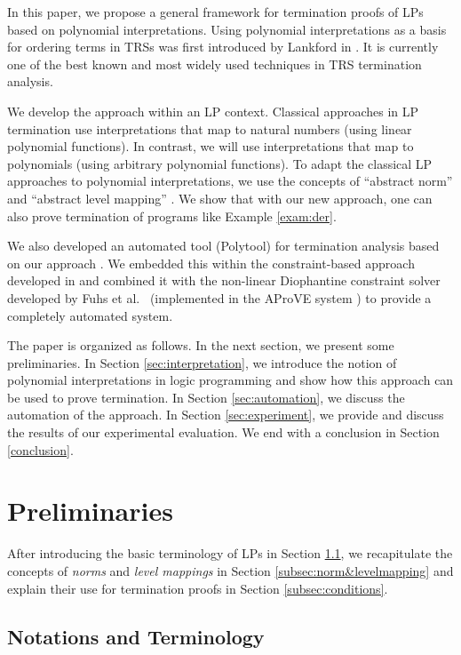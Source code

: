 \documentclass[envcountsame]{tlp}
\newcounter{ex:der-lastsymconsctr}
\begin{document}
In this paper, we propose a general framework for termination proofs of LPs based on
polynomial interpretations. Using polynomial interpretations as a basis for ordering
terms in TRSs was first introduced by Lankford in
\cite{Lankford79}. It is currently one of the best known and most widely used techniques
in TRS termination analysis.

We develop the approach within an LP context. 
Classical approaches in LP termination use 
interpretations that map to
natural numbers (using linear polynomial functions). In contrast, we will use interpretations that
map to polynomials (using arbitrary polynomial functions). To adapt the
classical LP approaches to polynomial interpretations, we use the concepts
of ``abstract norm'' and ``abstract level mapping''
\cite{Verschaetse&DeSchreye91}.
We show that with our new approach, one can also prove termination of programs
like Example \ref{exam:der}.

We also developed an automated tool (\textsf{Polytool}) for termination analysis based on
our approach \cite{Nguyen&DeSchreye06}. 
We embedded this within the constraint-based approach developed in
\cite{Decorteetal98} and combined it with the non-linear Diophantine constraint solver
developed by  Fuhs et al.\ \cite{Fuhsc07} (implemented in the \textsf{AProVE} system
\cite{Giesletal06}) to provide a completely automated system.

The paper is organized as follows. In the next section, we present some preliminaries. In
Section \ref{sec:interpretation}, we introduce the notion of polynomial interpretations
in logic programming and show how this approach can be used to prove termination.
In Section \ref{sec:automation}, we discuss the automation of the approach. In
Section \ref{sec:experiment}, we provide and discuss the results of our experimental
evaluation. We end with a conclusion in Section \ref{conclusion}.

\section{Preliminaries}\label{sec:preliminaries}


After
introducing the basic terminology of LPs in Section
\ref{subsec:notation}, we recapitulate the concepts of \emph{norms} and \emph{level
mappings} in Section \ref{subsec:norm&levelmapping} and explain their use for termination
proofs in Section \ref{subsec:conditions}.


\subsection{Notations and Terminology}\label{subsec:notation}
\end{document}
